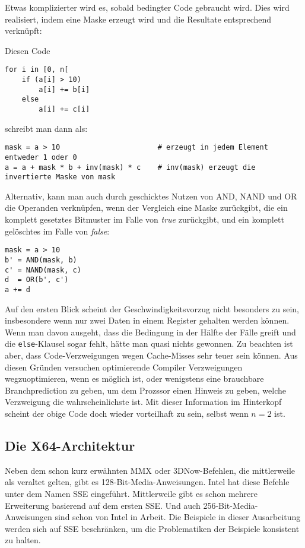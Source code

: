 \documentclass[a4paper,10pt]{article}
\begin{document}
Etwas komplizierter wird es, sobald bedingter Code gebraucht wird. Dies wird realisiert, indem eine
Maske erzeugt wird und die Resultate entsprechend verknüpft:

Diesen Code

\begin{verbatim}
for i in [0, n[
    if (a[i] > 10)
        a[i] += b[i]
    else
        a[i] += c[i]
\end{verbatim}
    
schreibt man dann als:

\begin{verbatim}
mask = a > 10                       # erzeugt in jedem Element entweder 1 oder 0
a = a + mask * b + inv(mask) * c    # inv(mask) erzeugt die invertierte Maske von mask
\end{verbatim}

Alternativ, kann man auch durch geschicktes Nutzen von AND, NAND und OR die Operanden
verknüpfen, wenn der Vergleich eine Maske zurückgibt, die ein komplett gesetztes Bitmuster
im Falle von \emph{true} zurückgibt, und ein komplett gelöschtes im Falle von \emph{false}:

\begin{verbatim}
mask = a > 10
b' = AND(mask, b)
c' = NAND(mask, c)
d  = OR(b', c')
a += d
\end{verbatim}

Auf den ersten Blick scheint der Geschwindigkeitsvorzug nicht besonders zu sein, insbesondere wenn
nur zwei Daten in einem Register gehalten werden können. Wenn man davon ausgeht, dass die Bedingung
in der Hälfte der Fälle greift und die \texttt{else}-Klausel sogar fehlt, hätte man quasi nichts
gewonnen. Zu beachten ist aber, dass Code-Verzweigungen wegen Cache-Misses sehr teuer sein können.
Aus diesen Gründen versuchen optimierende Compiler Verzweigungen wegzuoptimieren, wenn es möglich
ist, oder wenigstens eine brauchbare Branchprediction zu geben, um dem Prozssor einen Hinweis zu
geben, welche Verzweigung die wahrscheinlichste ist. Mit dieser Information im Hinterkopf scheint
der obige Code doch wieder vorteilhaft zu sein, selbst wenn $n = 2$ ist.

\subsection{Die X64-Architektur}

Neben dem schon kurz erwähnten MMX oder 3DNow-Befehlen, die mittlerweile als veraltet gelten, gibt
es 128-Bit-Media-Anweisungen. Intel hat diese Befehle unter dem Namen SSE eingeführt.  Mittlerweile
gibt es schon mehrere Erweiterung basierend auf dem ersten SSE. Und auch 256-Bit-Media-Anweisungen
sind schon von Intel in Arbeit. Die Beispiele in dieser Ausarbeitung werden sich auf SSE
beschränken, um die Problematiken der Beispiele konsistent zu halten.
\end{document}
